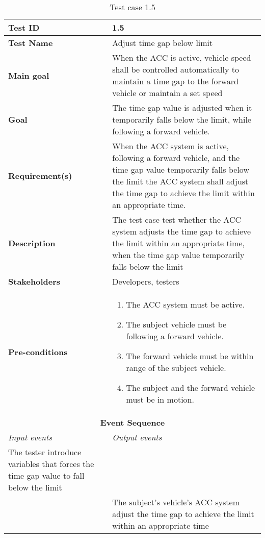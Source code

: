 \begin{table}[H]
\centering
\begin{tabularx}{\linewidth}{X|X}
  \hline
  \textbf{Test ID} & 1.5 \\
  \hline
  \textbf{Test Name} & Adjust time gap below limit \\
  \hline
  \textbf{Main goal} &  When the ACC is active, vehicle speed shall be controlled automatically to maintain a time gap to the forward vehicle or maintain a set speed  \\
  \hline
  \textbf{Goal} & The time gap value is adjusted when it temporarily falls below the limit, while following a forward vehicle. \\
  \hline
  \textbf{Requirement(s)} & When the ACC system is active, following a forward vehicle, and the time gap value temporarily falls below the limit the ACC system shall adjust the time gap to achieve the limit within an appropriate time. \\
  \hline
  \textbf{Description} & The test case test whether the ACC system adjusts the time gap to achieve the limit within an appropriate time, when the time gap value temporarily falls below the limit \\
  \hline
  \textbf{Stakeholders} & Developers, testers \\
  \hline
  \textbf{Pre-conditions} & 
  \begin{enumerate}
      \item The ACC system must be active.
      \item The subject vehicle must be following a forward vehicle.
      \item The forward vehicle must be within range of the subject vehicle.
      \item The subject and the forward vehicle must be in motion.
  \end{enumerate}
  \\
  \hline
  \multicolumn{2}{c}{\textbf{Event Sequence}} \\
  \hline
  \textit{Input events} & \textit{Output events} \\
  \hline
   The tester introduce variables that forces the time gap value to fall below the limit &  \\
  \hline
   &  The subject's vehicle's ACC system adjust the time gap to achieve the limit within an appropriate time\\
  \hline
  \end{tabularx}
\caption{\label{tab_case5} Test case 1.5}
\end{table}

